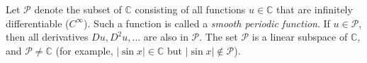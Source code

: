 Let $\mathcal{P}$ denote the subset of $\mathbb{C}$ consisting of all functions $u \in \mathbb{C}$ that are infinitely differentiable ($C^\infty$). Such a function is called a \emph{smooth periodic function}. If $u \in \mathcal{P}$, then all derivatives $Du, D^2u, \ldots$ are also in $\mathcal{P}$. The set $\mathcal{P}$ is a linear subspace of $\mathbb{C}$, and $\mathcal{P} \neq \mathbb{C}$ (for example, $|\sin x| \in \mathbb{C}$ but $|\sin x| \notin \mathcal{P}$).
